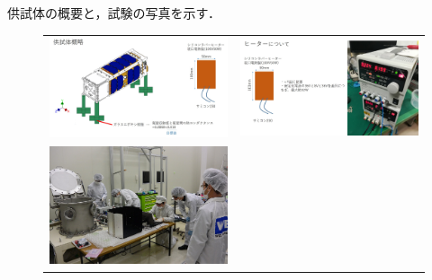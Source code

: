 供試体の概要と，試験の写真を示す．
\begin{figure}[H]
		\centering
		    \begin{tabular}{cc}
	 \begin{minipage}{0.5\hsize}
		\begin{center}
			\includegraphics[width=1\textwidth]{04/fig/4-8-1-1.jpg}
		\end{center}
	\end{minipage}&
	\begin{minipage}{0.5\hsize}
		\begin{center}
			\includegraphics[width=1\textwidth]{04/fig/4-8-1-2.jpg}
		\end{center}
	\end{minipage}\\
	 \begin{minipage}{0.5\hsize}
	\begin{center}
		\includegraphics[width=1\textwidth]{04/fig/4-8-1-3.jpg}

\end{center}
\end{minipage}
\end{tabular}
\end{figure}
